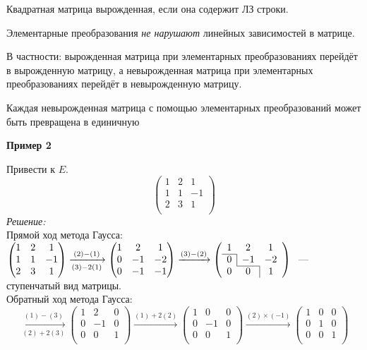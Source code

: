 Квадратная матрица вырожденная, если она содержит ЛЗ строки.

Элементарные преобразования \emph{не нарушают} линейных зависимостей в матрице.

В частности: вырожденная матрица при элементарных преобразованиях перейдёт в вырожденную матрицу, а невырожденная матрица при элементарных преобразованиях перейдёт в невырожденную матрицу.

\begin{theorem}
	Каждая невырожденная матрица с помощью элементарных преобразований может быть превращена в единичную
\end{theorem}
\noindent\textbf{Пример 2}

Привести к $E$.
$$
\begin{pmatrix}
	1 & 2 & 1\\
	1 & 1 & -1\\
	2 & 3 & 1\\
\end{pmatrix}
$$
\textit{Решение:}\\
Прямой ход метода Гаусса:\\
$
\begin{pmatrix}
1 & 2 & 1\\
1 & 1 & -1\\
2 & 3 & 1\\
\end{pmatrix}
\xrightarrow[(3)-2(1)]{(2)-(1)}
\begin{pmatrix}
1 & 2 & 1\\
0 & -1 & -2\\
0 & -1 & -1\\
\end{pmatrix}
\xrightarrow{(3)-(2)}
\left( \begin{array}{ccc}
1 & 2 & 1\\ \cline{1-1}
0 & \multicolumn{1}{|c}{-1} & -2\\\cline{2-2}
0 & 0 & \multicolumn{1}{|c}{1}\\
\end{array} \right)\
$ 
--- ступенчатый вид матрицы.\\
Обратный ход метода Гаусса:
$$
\xrightarrow[(2)+2(3)]{(1)-(3)}
\begin{pmatrix}
	1 & 2 & 0\\
	0 & -1 & 0\\
	0 & 0 & 1\\
\end{pmatrix}
\xrightarrow{(1)+2(2)}
\begin{pmatrix}
	1 & 0 & 0\\
	0 & -1 & 0\\
	0 & 0 & 1\\
\end{pmatrix}
\xrightarrow{(2)\times (-1)}
\begin{pmatrix}
	1 & 0 & 0\\
	0 & 1 & 0\\
	0 & 0 & 1\\
\end{pmatrix}
$$
